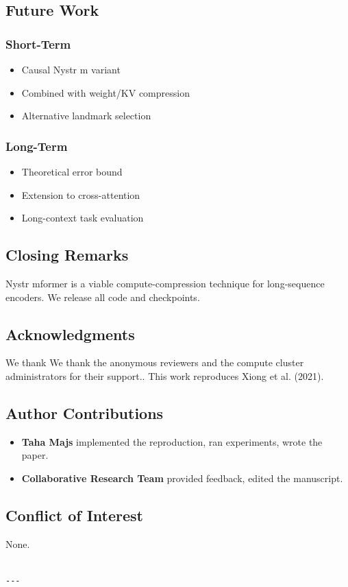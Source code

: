 \subsection{Future Work}

\subsubsection{Short-Term}
\begin{itemize}
\item Causal Nystr m variant
\item Combined with weight/KV compression
\item Alternative landmark selection

\end{itemize}
\subsubsection{Long-Term}
\begin{itemize}
\item Theoretical error bound
\item Extension to cross-attention
\item Long-context task evaluation

\end{itemize}
\subsection{Closing Remarks}

Nystr mformer is a viable compute-compression technique for long-sequence 
encoders. We release all code and checkpoints.

\subsection{Acknowledgments}

We thank We thank the anonymous reviewers and the compute cluster administrators for their support.. This work reproduces Xiong et al. (2021).

\subsection{Author Contributions}

\begin{itemize}
\item \textbf{Taha Majs} implemented the reproduction, ran experiments, wrote
  the paper.
\item \textbf{Collaborative Research Team} provided feedback, edited the manuscript.

\end{itemize}
\subsection{Conflict of Interest}

None.
\begin{lstlisting}

---
\end{lstlisting}